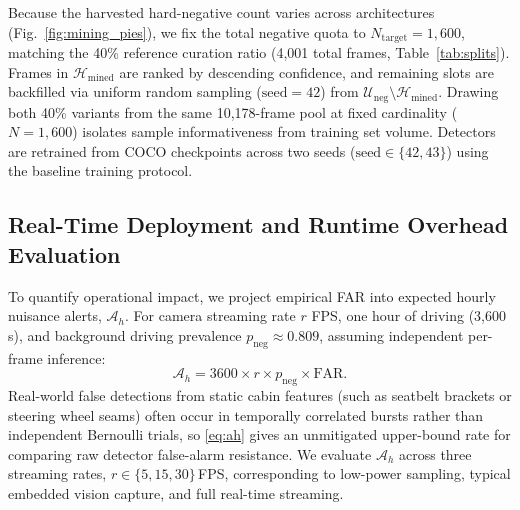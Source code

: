 \documentclass[conference]{IEEEtran}
\begin{document}
Because the harvested hard-negative count varies across architectures (Fig.~\ref{fig:mining_pies}), we fix the total negative quota to $N_{\mathrm{target}} = 1{,}600$, matching the 40\% reference curation ratio (4,001 total frames, Table~\ref{tab:splits}). Frames in $\mathcal{H}_{\mathrm{mined}}$ are ranked by descending confidence, and remaining slots are backfilled via uniform random sampling ($\text{seed} = 42$) from $\mathcal{U}_{\mathrm{neg}} \setminus \mathcal{H}_{\mathrm{mined}}$. Drawing both 40\% variants from the same 10{,}178-frame pool at fixed cardinality ($N = 1{,}600$) isolates sample informativeness from training set volume. Detectors are retrained from COCO checkpoints across two seeds ($\text{seed} \in \{42, 43\}$) using the baseline training protocol.


\subsection{Real-Time Deployment and Runtime Overhead Evaluation}
\label{subsec:deployment}
To quantify operational impact, we project empirical FAR into expected hourly nuisance alerts, $\mathcal{A}_h$. For camera streaming rate $r$ FPS, one hour of driving (3,600\,s), and background driving prevalence $p_{\mathrm{neg}} \approx 0.809$, assuming independent per-frame inference:
\begin{equation}
\mathcal{A}_h = 3600 \times r \times p_{\mathrm{neg}} \times \text{FAR}.
\label{eq:ah}
\end{equation}
Real-world false detections from static cabin features (such as seatbelt brackets or steering wheel seams) often occur in temporally correlated bursts rather than independent Bernoulli trials, so \eqref{eq:ah} gives an unmitigated upper-bound rate for comparing raw detector false-alarm resistance. We evaluate $\mathcal{A}_h$ across three streaming rates, $r \in \{5, 15, 30\}$\,FPS, corresponding to low-power sampling, typical embedded vision capture, and full real-time streaming.
\end{document}

